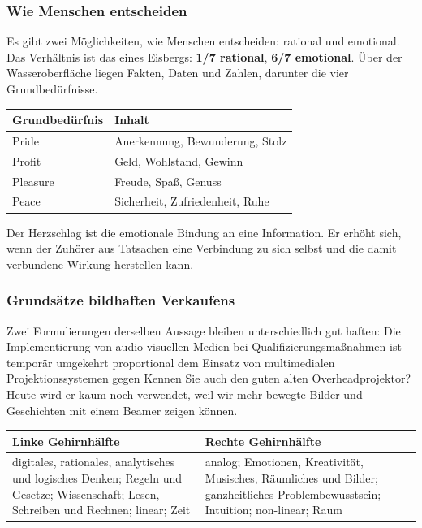 \documentclass[12pt, a4paper]{article}
\begin{document}
\subsubsection{Wie Menschen entscheiden}

Es gibt zwei Möglichkeiten, wie Menschen entscheiden: rational und emotional.
Das Verhältnis ist das eines Eisbergs: \textbf{1/7 rational}, \textbf{6/7
emotional}. Über der Wasseroberfläche liegen Fakten, Daten und Zahlen,
darunter die vier Grundbedürfnisse.

\begin{center}
\begin{tabular}{ll}
\textbf{Grundbedürfnis} & \textbf{Inhalt}\\\hline
Pride & Anerkennung, Bewunderung, Stolz\\
Profit & Geld, Wohlstand, Gewinn\\
Pleasure & Freude, Spaß, Genuss\\
Peace & Sicherheit, Zufriedenheit, Ruhe\\
\end{tabular}
\end{center}

Der Herzschlag ist die emotionale Bindung an eine Information. Er erhöht
sich, wenn der Zuhörer aus Tatsachen eine Verbindung zu sich selbst und die
damit verbundene Wirkung herstellen kann.

\subsubsection{Grundsätze bildhaften Verkaufens}

Zwei Formulierungen derselben Aussage bleiben unterschiedlich gut haften:
\glqq Die Implementierung von audio-visuellen Medien bei
Qualifizierungsmaßnahmen ist temporär umgekehrt proportional dem Einsatz von
multimedialen Projektionssystemen\grqq{} gegen \glqq Kennen Sie auch den
guten alten Overheadprojektor? Heute wird er kaum noch verwendet, weil wir
mehr bewegte Bilder und Geschichten mit einem Beamer zeigen können.\grqq{}

\begin{center}
\begin{tabular}{p{}p{}}
\textbf{Linke Gehirnhälfte} & \textbf{Rechte Gehirnhälfte}\\\hline
digitales, rationales, analytisches und logisches Denken; Regeln und Gesetze;
Wissenschaft; Lesen, Schreiben und Rechnen; linear; Zeit
&
analog; Emotionen, Kreativität, Musisches, Räumliches und Bilder;
ganzheitliches Problembewusstsein; Intuition; non-linear; Raum\\
\end{tabular}
\end{center}
\end{document}
